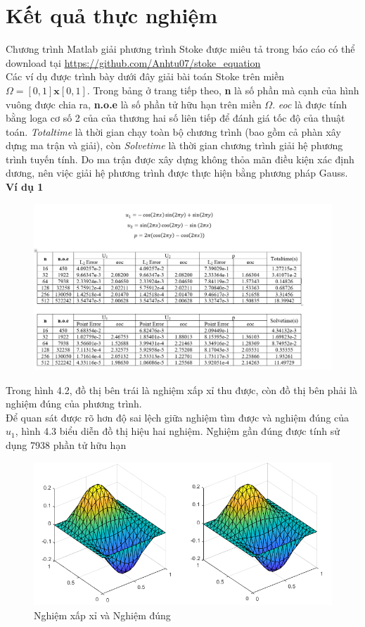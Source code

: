 \documentclass[14pt]{extreport}
\begin{document}
{\chapter{Kết quả thực nghiệm}
Chương trình Matlab giải phương trình Stoke được miêu tả trong báo cáo có thể download tại \url{https://github.com/Anhtu07/stoke_equation} \\

Các ví dụ được trình bày dưới đây giải bài toán Stoke trên miền $\Omega = [0, 1] \mathbf{x}[0, 1]$. Trong bảng ở trang tiếp theo, \textbf{n} là số phần mà cạnh của hình vuông được chia ra, \textbf{n.o.e} là số phần tử hữu hạn trên miền $\Omega$. \textit{eoc} là được tính bằng loga cơ số 2 của của thương hai số liên tiếp để đánh giá tốc độ của thuật toán. \textit{Totaltime} là thời gian chạy toàn bộ chương trình (bao gồm cả phàn xây dựng ma trận và giải), còn \textit{Solvetime} là thời gian chương trình giải hệ phương trình tuyến tính. Do ma trận được xây dựng không thỏa mãn điều kiện xác định dương, nên việc giải hệ phương trình được thực hiện bằng phương pháp Gauss.
\newpage
\textbf{Ví dụ 1}
\begin{figure}[h!]
\centering
\includegraphics[scale=0.55]{VD1}
\caption{}
\end{figure}

Trong hình 4.2, đồ thị bên trái là nghiệm xấp xỉ thu được, còn đồ thị bên phải là nghiệm đúng của phương trình. \\

Để quan sát được rõ hơn độ sai lệch giữa nghiệm tìm được và nghiệm đúng của $u_1$, hình 4.3 biểu diễn đồ thị hiệu hai nghiệm. Nghiệm gần đúng được tính sử dụng 7938 phần tử hữu hạn \\
\begin{figure}[h!]
\centering
\includegraphics[scale=0.8]{450_tri_1}
\caption{ Nghiệm xấp xỉ và Nghiệm đúng}
\end{figure}

}
\end{document}
